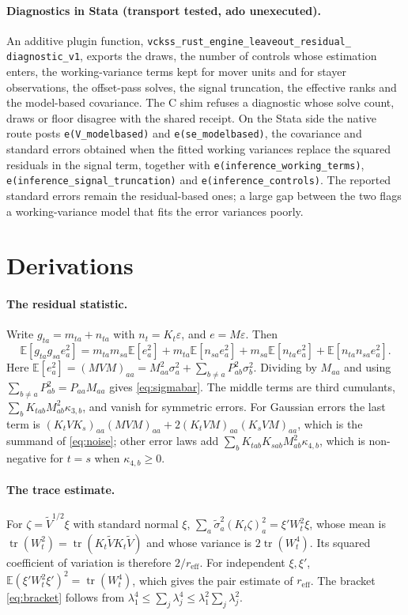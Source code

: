 \documentclass[11pt]{article}
\newcommand{\E}{\mathbb{E}}
\newcommand{\tr}{\operatorname{tr}}
\newcommand{\reff}{r_{\mathrm{eff}}}
\begin{document}
\begin{sloppypar}
\paragraph{Diagnostics in Stata (transport tested, ado unexecuted).} An
additive plugin function, \texttt{vckss\_rust\_engine\_leaveout\_residual\_\allowbreak
diagnostic\_v1}, exports the draws, the number of controls whose estimation
enters, the working-variance terms kept for mover units and for stayer
observations, the offset-pass solves, the signal truncation, the effective
ranks and the model-based covariance. The C shim refuses a diagnostic whose
solve count, draws or floor disagree with the shared receipt. On the Stata side
the native route posts \texttt{e(V\_modelbased)} and
\texttt{e(se\_modelbased)}, the covariance and standard errors obtained when
the fitted working variances replace the squared residuals in the signal
term, together with \texttt{e(inference\_working\_terms)},
\texttt{e(inference\_signal\_truncation)} and
\texttt{e(inference\_controls)}. The reported standard errors remain the
residual-based ones; a large gap between the two flags a working-variance
model that fits the error variances poorly.
\end{sloppypar}

\appendix
\section{Derivations}\label{sec:derivations}

\paragraph{The residual statistic.} Write $g_{ta}=m_{ta}+n_{ta}$ with
$n_t=K_t\varepsilon$, and $e=M\varepsilon$. Then
\[
 \E[g_{ta}g_{sa}e_a^2]=m_{ta}m_{sa}\E[e_a^2]
 +m_{ta}\E[n_{sa}e_a^2]+m_{sa}\E[n_{ta}e_a^2]+\E[n_{ta}n_{sa}e_a^2].
\]
Here $\E[e_a^2]=(MVM)_{aa}=M_{aa}^2\sigma_a^2+\sum_{b\ne a}P_{ab}^2\sigma_b^2$.
Dividing by $M_{aa}$ and using $\sum_{b\neq a}P_{ab}^2=P_{aa}M_{aa}$ gives
\eqref{eq:sigmabar}. The middle terms are third cumulants,
$\sum_bK_{tab}M_{ab}^2\kappa_{3,b}$, and vanish for symmetric errors. For
Gaussian errors the last term is
$(K_tVK_s)_{aa}(MVM)_{aa}+2(K_tVM)_{aa}(K_sVM)_{aa}$, which is the summand of
\eqref{eq:noise}; other error laws add
$\sum_bK_{tab}K_{sab}M_{ab}^2\kappa_{4,b}$, which is non-negative for $t=s$
when $\kappa_{4,b}\ge0$.

\paragraph{The trace estimate.} For $\zeta=\tilde V^{1/2}\xi$ with standard
normal $\xi$, $\sum_a\tilde\sigma_a^2(K_t\zeta)_a^2=\xi'W_t^2\xi$, whose mean
is $\tr(W_t^2)=\tr(K_t\tilde VK_t\tilde V)$ and whose variance is
$2\tr(W_t^4)$. Its squared coefficient of variation is therefore $2/\reff$.
For independent $\xi,\xi'$, $\E(\xi'W_t^2\xi')^2=\tr(W_t^4)$, which gives the
pair estimate of $\reff$. The bracket \eqref{eq:bracket} follows from
$\lambda_1^4\le\sum_j\lambda_j^4\le\lambda_1^2\sum_j\lambda_j^2$.
\end{document}
